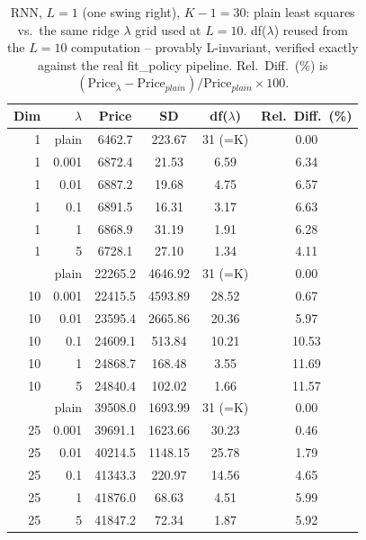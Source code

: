 \begin{table}

\caption{\label{tab:rnn_ridge_lambda_L1}RNN, $L=1$ (one swing right), $K-1=30$: plain least squares vs.\ the same ridge $\lambda$ grid used at $L=10$. df($\lambda$) reused from the $L=10$ computation -- provably L-invariant, verified exactly against the real fit\_policy pipeline. Rel.\ Diff.\ (\%) is $(\text{Price}_\lambda - \text{Price}_{plain})/\text{Price}_{plain}\times 100$.}
\footnotesize
\setlength{\tabcolsep}{4pt}
\centering
\begin{tabular}[t]{rrcccc}
\toprule
Dim & $\lambda$ & Price & SD & df($\lambda$) & Rel.\ Diff.\ (\%)\\
\midrule
1 & plain & 6462.7 & 223.67 & 31 (=K) & 0.00\\
1 & 0.001 & 6872.4 & 21.53 & 6.59 & 6.34\\
1 & 0.01 & 6887.2 & 19.68 & 4.75 & 6.57\\
1 & 0.1 & 6891.5 & 16.31 & 3.17 & 6.63\\
1 & 1 & 6868.9 & 31.19 & 1.91 & 6.28\\
1 & 5 & 6728.1 & 27.10 & 1.34 & 4.11\\
\addlinespace
10 & plain & 22265.2 & 4646.92 & 31 (=K) & 0.00\\
10 & 0.001 & 22415.5 & 4593.89 & 28.52 & 0.67\\
10 & 0.01 & 23595.4 & 2665.86 & 20.36 & 5.97\\
10 & 0.1 & 24609.1 & 513.84 & 10.21 & 10.53\\
10 & 1 & 24868.7 & 168.48 & 3.55 & 11.69\\
10 & 5 & 24840.4 & 102.02 & 1.66 & 11.57\\
\addlinespace
25 & plain & 39508.0 & 1693.99 & 31 (=K) & 0.00\\
25 & 0.001 & 39691.1 & 1623.66 & 30.23 & 0.46\\
25 & 0.01 & 40214.5 & 1148.15 & 25.78 & 1.79\\
25 & 0.1 & 41343.3 & 220.97 & 14.56 & 4.65\\
25 & 1 & 41876.0 & 68.63 & 4.51 & 5.99\\
25 & 5 & 41847.2 & 72.34 & 1.87 & 5.92\\
\bottomrule
\end{tabular}
\end{table}
